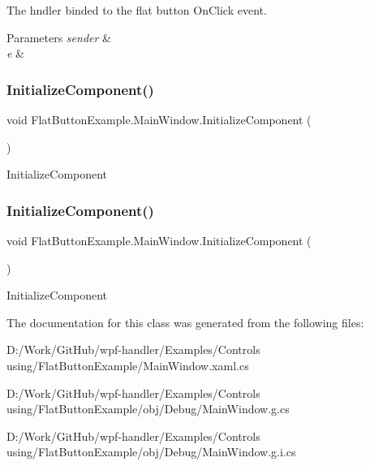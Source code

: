 The hndler binded to the flat button On\+Click event. 


\begin{DoxyParams}{Parameters}
{\em sender} & \\
\hline
{\em e} & \\
\hline
\end{DoxyParams}
\mbox{\label{class_flat_button_example_1_1_main_window_a1654b57dd9f691e969927f13abcecc4f}} 
\subsubsection{\texorpdfstring{Initialize\+Component()}{InitializeComponent()}\hspace{0.1cm}{\footnotesize\ttfamily [1/2]}}
{\footnotesize\ttfamily void Flat\+Button\+Example.\+Main\+Window.\+Initialize\+Component (\begin{DoxyParamCaption}{ }\end{DoxyParamCaption})}



Initialize\+Component 

\mbox{\label{class_flat_button_example_1_1_main_window_a1654b57dd9f691e969927f13abcecc4f}} 
\subsubsection{\texorpdfstring{Initialize\+Component()}{InitializeComponent()}\hspace{0.1cm}{\footnotesize\ttfamily [2/2]}}
{\footnotesize\ttfamily void Flat\+Button\+Example.\+Main\+Window.\+Initialize\+Component (\begin{DoxyParamCaption}{ }\end{DoxyParamCaption})}



Initialize\+Component 



The documentation for this class was generated from the following files\+:\begin{DoxyCompactItemize}
\item 
D\+:/\+Work/\+Git\+Hub/wpf-\/handler/\+Examples/\+Controls using/\+Flat\+Button\+Example/Main\+Window.\+xaml.\+cs\item 
D\+:/\+Work/\+Git\+Hub/wpf-\/handler/\+Examples/\+Controls using/\+Flat\+Button\+Example/obj/\+Debug/Main\+Window.\+g.\+cs\item 
D\+:/\+Work/\+Git\+Hub/wpf-\/handler/\+Examples/\+Controls using/\+Flat\+Button\+Example/obj/\+Debug/Main\+Window.\+g.\+i.\+cs\end{DoxyCompactItemize}
